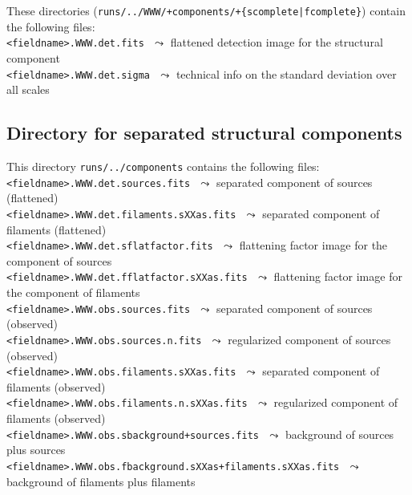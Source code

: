 \documentclass[a4paper,10pt]{article}
\begin{document}
These directories (\verb!runs/../WWW/+components/+{scomplete|fcomplete}!) contain the following files:\\

\vspace{-2mm}\noindent
{\small\verb!<fieldname>.WWW.det.fits!} $\,\,\leadsto$ flattened detection image for the structural component\\
{\small\verb!<fieldname>.WWW.det.sigma!} $\,\,\leadsto$ technical info on the standard deviation over all scales


\subsection{Directory for separated structural components}
\label{components}

This directory \verb!runs/../components! contains the following files:\\

\vspace{-2mm}\noindent
{\small\verb!<fieldname>.WWW.det.sources.fits!} $\,\,\leadsto$ separated component of sources (flattened)\\
{\small\verb!<fieldname>.WWW.det.filaments.sXXas.fits!} $\,\,\leadsto$ separated component of filaments (flattened)\\
{\small\verb!<fieldname>.WWW.det.sflatfactor.fits!} $\,\,\leadsto$ flattening factor image for the component of sources\\
{\small\verb!<fieldname>.WWW.det.fflatfactor.sXXas.fits!} $\,\,\leadsto$ flattening factor image for the component of filaments\\
{\small\verb!<fieldname>.WWW.obs.sources.fits!} $\,\,\leadsto$ separated component of sources (observed)\\
{\small\verb!<fieldname>.WWW.obs.sources.n.fits!} $\,\,\leadsto$ regularized component of sources (observed)\\
{\small\verb!<fieldname>.WWW.obs.filaments.sXXas.fits!} $\,\,\leadsto$ separated component of filaments (observed)\\
{\small\verb!<fieldname>.WWW.obs.filaments.n.sXXas.fits!} $\,\,\leadsto$ regularized component of filaments (observed)\\
{\small\verb!<fieldname>.WWW.obs.sbackground+sources.fits!} $\,\,\leadsto$ background of sources plus sources\\
{\small\verb!<fieldname>.WWW.obs.fbackground.sXXas+filaments.sXXas.fits!} $\,\,\leadsto$ background of filaments plus filaments
\end{document}
